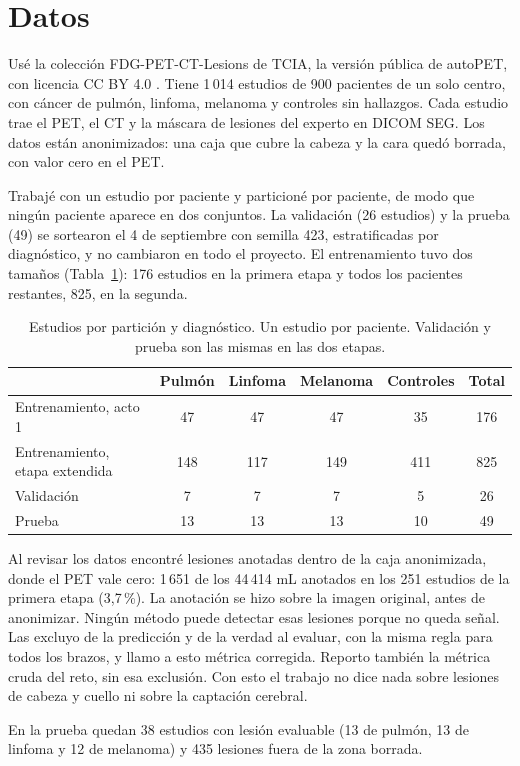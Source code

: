 \section{Datos}

Usé la colección FDG-PET-CT-Lesions de TCIA, la versión pública de autoPET, con licencia CC BY 4.0 \citep{gatidis2022data}. Tiene 1\,014 estudios de 900 pacientes de un solo centro, con cáncer de pulmón, linfoma, melanoma y controles sin hallazgos. Cada estudio trae el PET, el CT y la máscara de lesiones del experto en DICOM SEG. Los datos están anonimizados: una caja que cubre la cabeza y la cara quedó borrada, con valor cero en el PET.

Trabajé con un estudio por paciente y particioné por paciente, de modo que ningún paciente aparece en dos conjuntos. La validación (26 estudios) y la prueba (49) se sortearon el 4 de septiembre con semilla 423, estratificadas por diagnóstico, y no cambiaron en todo el proyecto. El entrenamiento tuvo dos tamaños (Tabla~\ref{tab:datos}): 176 estudios en la primera etapa y todos los pacientes restantes, 825, en la segunda.

\begin{table}[h]
\centering\small
\caption{Estudios por partición y diagnóstico. Un estudio por paciente. Validación y prueba son las mismas en las dos etapas.}
\label{tab:datos}
\begin{tabular}{lccccc}
\toprule
 & Pulmón & Linfoma & Melanoma & Controles & Total \\
\midrule
Entrenamiento, acto 1 & 47 & 47 & 47 & 35 & 176 \\
Entrenamiento, etapa extendida & 148 & 117 & 149 & 411 & 825 \\
Validación & 7 & 7 & 7 & 5 & 26 \\
Prueba & 13 & 13 & 13 & 10 & 49 \\
\bottomrule
\end{tabular}
\end{table}

Al revisar los datos encontré lesiones anotadas dentro de la caja anonimizada, donde el PET vale cero: 1\,651 de los 44\,414 mL anotados en los 251 estudios de la primera etapa (3,7\,\%). La anotación se hizo sobre la imagen original, antes de anonimizar. Ningún método puede detectar esas lesiones porque no queda señal. Las excluyo de la predicción y de la verdad al evaluar, con la misma regla para todos los brazos, y llamo a esto métrica corregida. Reporto también la métrica cruda del reto, sin esa exclusión. Con esto el trabajo no dice nada sobre lesiones de cabeza y cuello ni sobre la captación cerebral.

En la prueba quedan 38 estudios con lesión evaluable (13 de pulmón, 13 de linfoma y 12 de melanoma) y 435 lesiones fuera de la zona borrada.
